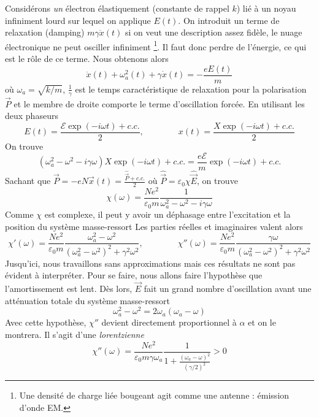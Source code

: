 	Considérons \textit{un} électron élastiquement (constante de rappel $k$) lié à un noyau infiniment lourd sur
	lequel on applique $E(t)$. On introduit un terme de relaxation (damping) $m\gamma\dot{x}(t)$ si on veut une
	description assez fidèle, le nuage électronique ne peut osciller infiniment \footnote{Une densité de charge liée
	bougeant agit comme une antenne : émission d'onde EM.}. Il faut donc perdre de l'énergie, ce qui est le rôle de
	ce terme. Nous obtenons alors
	\begin{equation}
	\ddot{x}(t) + \omega_a^2(t)+\gamma\dot{x}(t) = -\frac{eE(t)}{m}
	\end{equation}
	où $\omega_a = \sqrt{k/m}$, $\frac{1}{\gamma}$ est le temps caractéristique de relaxation pour la polarisation 
	$\vec{P}$ et le membre de droite comporte le terme d'oscillation forcée. En utilisant les deux phaseurs
	\begin{equation}
	E(t) = \frac{\mathcal{E}\exp(-i\omega t) + c.c.}{2},\qquad\qquad
	x(t) = \frac{X\exp(-i\omega t) + c.c.}{2}
	\end{equation}
	On trouve
	\begin{equation}
	(\omega_a^2-\omega^2-i\gamma\omega)X\exp(-i\omega t)+c.c. = \frac{e\mathcal{E}}{m}\exp(-i\omega t)+c.c.
	\end{equation}
	Sachant que $\vec{P}=-eN\vec{x}(t)=\frac{\hat{\vec{P}}+c.c.}{2}$ où $\hat{\vec{P}}=\varepsilon_0\chi\hat{
	\vec{E}}$, on trouve
	\begin{equation}
	\chi(\omega) = \dfrac{Ne^2}{\varepsilon_0m}\dfrac{1}{\omega_a^2-\omega^2-i\gamma\omega}
	\end{equation}
	Comme $\chi$ est complexe, il peut y avoir un déphasage entre l'excitation et la position du système 
	masse-ressort
	Les parties réelles et imaginaires valent alors
	\begin{equation}
	\chi'(\omega) = \dfrac{Ne^2}{\varepsilon_0m}\dfrac{\omega_a^2-\omega^2}{(\omega_a^2-\omega^2)^2+\gamma^2
	\omega^2},\qquad\qquad\chi''(\omega) = \dfrac{Ne^2}{\varepsilon_0m}\dfrac{\gamma\omega}{(\omega_a^2-\omega^2)^2+\gamma^2
	\omega^2}
	\end{equation}
	Jusqu'ici, nous travaillons sans approximations mais ces résultats ne sont pas évident à interpréter. Pour 
	se faire, nous allons faire l'hypothèse que l'amortissement est lent. Dès lors, $\vec{E}$ fait un grand 
	nombre d'oscillation avant une atténuation totale du système masse-ressort
	\begin{equation}
	\omega_a^2-\omega^2 = 2\omega_a(\omega_a-\omega)
	\end{equation}
	Avec cette hypothèse, $\chi''$ devient directement proportionnel à $\alpha$ et on le montrera. Il s'agit 
	d'une \textit{lorentzienne}
	\begin{equation}
	\chi''(\omega) = \dfrac{Ne^2}{\varepsilon_0m\gamma\omega_a}\dfrac{1}{1+\frac{(\omega_a-\omega)^2}{(\gamma
	/2)^2}} > 0
	\end{equation}
	
